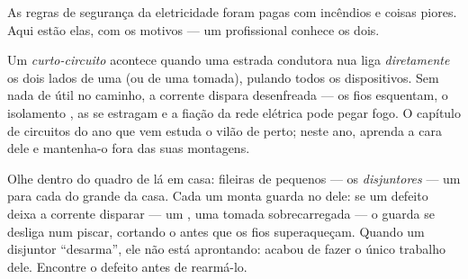 As regras de segurança da eletricidade foram pagas com incêndios e
coisas piores. Aqui estão elas, com os motivos --- um profissional
conhece os dois.

\begin{definition}\label{def:g6:circuits-and-safety:short}
Um \emph{curto-circuito} acontece quando uma
estrada condutora nua liga \emph{diretamente} os dois lados de uma
 (ou de uma tomada), pulando todos os dispositivos. Sem nada de
útil no caminho, a corrente dispara desenfreada --- os fios
esquentam, o isolamento , as  se estragam e a fiação da
rede elétrica pode pegar fogo. O capítulo de circuitos do ano que vem
estuda o vilão de perto; neste ano, aprenda a cara dele e mantenha-o
fora das suas montagens.
\end{definition}

\begin{remark}\label{rem:g6:circuits-and-safety:guards}
Olhe dentro do quadro de  lá em casa: fileiras de pequenos
 --- os \emph{disjuntores} --- um para cada  do
grande  da casa. Cada um monta guarda no 
dele: se um defeito deixa a corrente disparar --- um ,
uma tomada sobrecarregada --- o guarda se desliga num piscar,
cortando o  antes que os fios superaqueçam. Quando um disjuntor
``desarma'', ele não está aprontando: acabou de fazer o único
trabalho dele. Encontre o defeito antes de rearmá-lo.
\end{remark}

